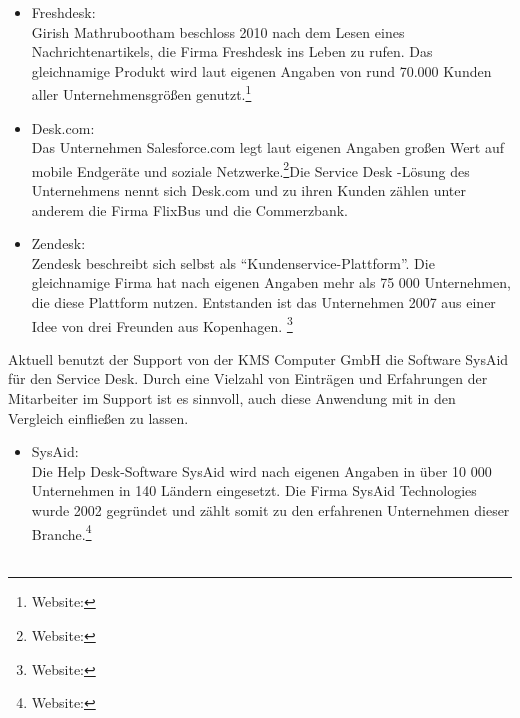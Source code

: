 \begin{itemize}
\item Freshdesk:\\
		Girish Mathrubootham beschloss 2010 nach dem Lesen eines Nachrichtenartikels, die Firma 
		Freshdesk ins Leben zu rufen. Das gleichnamige Produkt wird laut eigenen Angaben von rund 
		70.000 Kunden aller Unternehmensgrößen genutzt.\footnote{Website:\cite{Freshdesk}}
		\\
		 
\item Desk.com:\\
		Das Unternehmen Salesforce.com legt laut eigenen Angaben großen Wert auf mobile 
		Endgeräte und soziale Netzwerke.\footnote{Website:\cite{Salesforce}}Die Service Desk -Lösung 
		des Unternehmens nennt sich Desk.com und zu ihren Kunden zählen unter anderem die Firma 
		FlixBus und die Commerzbank.
		\\
		
\item Zendesk:\\
		Zendesk beschreibt sich selbst als \enquote{Kundenservice-Plattform}. Die gleichnamige 
		Firma hat nach eigenen Angaben mehr als 75 000 Unternehmen, die diese Plattform nutzen. 
		Entstanden ist das Unternehmen 2007 aus einer Idee von drei Freunden aus Kopenhagen.
		\footnote{Website:\cite{Zendesk}}
		\\		
\end{itemize}

\noindent
Aktuell benutzt der Support von der KMS Computer GmbH die Software SysAid für den Service Desk. Durch eine Vielzahl von Einträgen und Erfahrungen der Mitarbeiter im Support ist es sinnvoll, auch diese Anwendung mit in den Vergleich einfließen zu lassen.

\begin{itemize}
\item SysAid:\\
		 Die Help Desk-Software SysAid wird nach eigenen Angaben in über 10 000 Unternehmen in 
		 140 Ländern eingesetzt. Die Firma SysAid Technologies wurde 2002 gegründet und zählt somit 
		 zu den erfahrenen Unternehmen dieser Branche.\footnote{Website:\cite{SysAid}}
		\\\\
\end{itemize}	

